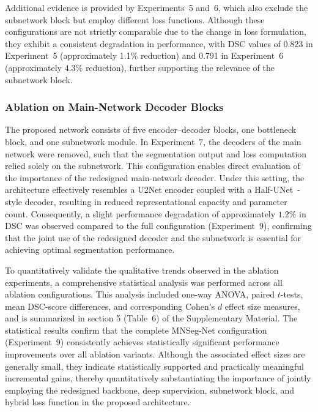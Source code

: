  Additional evidence is provided by Experiments~5 and~6, which also exclude the subnetwork block but employ different loss functions. Although these configurations are not strictly comparable due to the change in loss formulation, they exhibit a consistent degradation in performance, with DSC values of 0.823 in Experiment~5 (approximately 1.1\% reduction) and 0.791 in Experiment~6 (approximately 4.3\% reduction), further supporting the relevance of the subnetwork block.



\subsubsection{Ablation on Main-Network Decoder Blocks}
The proposed network consists of five encoder--decoder blocks, one bottleneck block, and one subnetwork module. In Experiment~7, the decoders of the main network were removed, such that the segmentation output and loss computation relied solely on the subnetwork. This configuration enables direct evaluation of the importance of the redesigned main-network decoder. Under this setting, the architecture effectively resembles a U2Net encoder coupled with a Half-UNet~\cite{lu2022half}-style decoder, resulting in reduced representational capacity and parameter count. Consequently, a slight performance degradation of approximately $1.2\%$ in DSC was observed compared to the full configuration (Experiment~9), confirming that the joint use of the redesigned decoder and the subnetwork is essential for achieving optimal segmentation performance.



{To quantitatively validate the qualitative trends observed in the ablation
experiments, a comprehensive statistical analysis was performed across all ablation configurations. This analysis included one-way ANOVA, paired $t$-tests, mean DSC-score differences, and corresponding Cohen’s $d$ effect size measures, and is summarized in section 5 (Table~6) of the Supplementary Material. The statistical
results confirm that the complete MNSeg-Net configuration (Experiment~9) consistently achieves statistically significant performance improvements over all ablation variants. Although the associated effect sizes are generally small, they indicate statistically supported and practically meaningful incremental
gains, thereby quantitatively substantiating the importance of jointly employing the redesigned backbone, deep supervision, subnetwork block, and hybrid loss function in the proposed architecture.}






